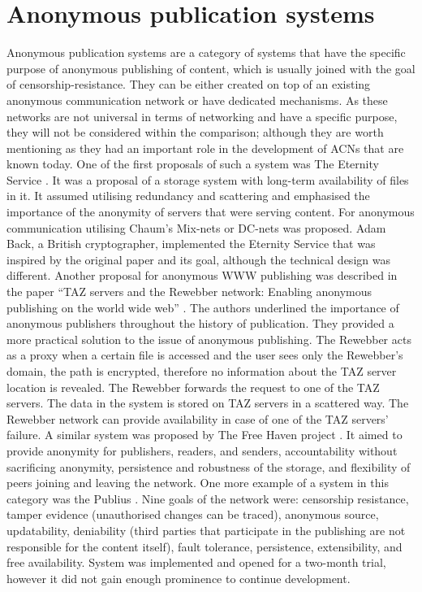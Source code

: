 \section{Anonymous publication systems}
Anonymous publication systems are a category of systems that have the specific purpose of anonymous publishing of content, which is usually joined with the goal of censorship-resistance. They can be either created on top of an existing anonymous communication network or have dedicated mechanisms. As these networks are not universal in terms of networking and have a specific purpose, they will not be considered within the comparison; although they are worth mentioning as they had an important role in the development of ACNs that are known today.
One of the first proposals of such a system was The Eternity Service \cite{eternity}. It was a proposal of a storage system with long-term availability of files in it. It assumed utilising redundancy and scattering and emphasised the importance of the anonymity of servers that were serving content. For anonymous communication utilising Chaum's Mix-nets or DC-nets was proposed. Adam Back, a British cryptographer, implemented the Eternity Service \cite{back1997eternity} that was inspired by the original paper and its goal, although the technical design was different.
Another proposal for anonymous WWW publishing was described in the paper “TAZ servers and the Rewebber network: Enabling anonymous publishing on the world wide web” \cite{rewebber}. The authors underlined the importance of anonymous publishers throughout the history of publication. They provided a more practical solution to the issue of anonymous publishing. The Rewebber acts as a proxy when a certain file is accessed and the user sees only the Rewebber’s domain, the path is encrypted, therefore no information about the TAZ server location is revealed. The Rewebber forwards the request to one of the TAZ servers. The data in the system is stored on TAZ servers in a scattered way. The Rewebber network can provide availability in case of one of the TAZ servers' failure.
A similar system was proposed by The Free Haven project \cite{freehaven}. It aimed to provide anonymity for publishers, readers, and senders, accountability without sacrificing anonymity, persistence and robustness of the storage, and flexibility of peers joining and leaving the network.
One more example of a system in this category was the Publius \cite{publius}. Nine goals of the network were: censorship resistance, tamper evidence (unauthorised changes can be traced), anonymous source, updatability, deniability (third parties that participate in the publishing are not responsible for the content itself), fault tolerance, persistence, extensibility, and free availability. System was implemented and opened for a two-month trial, however it did not gain enough prominence to continue development.
